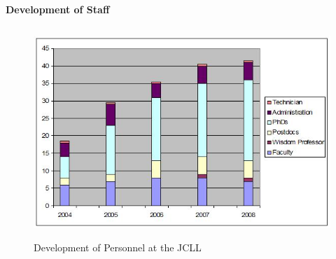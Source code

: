 $$ $$
\paragraph{}
\textbf{Development of Staff}

\begin{figure}[htbp]

		\includegraphics[width=1.0\textwidth,height=8cm]{photo5.jpg}
		\caption{Development of Personnel at the JCLL}

\end{figure}